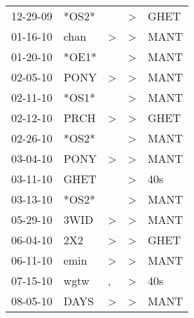\begin{supertabular}{p{0.07\textwidth}p{0.06\textwidth}p{0.02\textwidth}p{0.02\textwidth}p{0.06\textwidth}}
          12-29-09\textsuperscript{} &                            *OS2* &                  &  \textgreater &           GHET\textsuperscript{} \\
          01-16-10\textsuperscript{} &           chan\textsuperscript{} &     \textgreater &  \textgreater &           MANT\textsuperscript{} \\
          01-20-10\textsuperscript{} &                            *OE1* &                  &  \textgreater &           MANT\textsuperscript{} \\
          02-05-10\textsuperscript{} &           PONY\textsuperscript{} &     \textgreater &  \textgreater &           MANT\textsuperscript{} \\
          02-11-10\textsuperscript{} &                            *OS1* &                  &  \textgreater &           MANT\textsuperscript{} \\
          02-12-10\textsuperscript{} &           PRCH\textsuperscript{} &     \textgreater &  \textgreater &           GHET\textsuperscript{} \\
          02-26-10\textsuperscript{} &                            *OS2* &                  &  \textgreater &           MANT\textsuperscript{} \\
          03-04-10\textsuperscript{} &           PONY\textsuperscript{} &     \textgreater &  \textgreater &           MANT\textsuperscript{} \\
          03-11-10\textsuperscript{} &           GHET\textsuperscript{} &                  &  \textgreater &            40s\textsuperscript{} \\
          03-13-10\textsuperscript{} &                            *OS2* &                  &  \textgreater &           MANT\textsuperscript{} \\
          05-29-10\textsuperscript{} &           3WID\textsuperscript{} &     \textgreater &  \textgreater &           MANT\textsuperscript{} \\
          06-04-10\textsuperscript{} &            2X2\textsuperscript{} &     \textgreater &  \textgreater &           GHET\textsuperscript{} \\
          06-11-10\textsuperscript{} &           emin\textsuperscript{} &     \textgreater &  \textgreater &           MANT\textsuperscript{} \\
          07-15-10\textsuperscript{} &           wgtw\textsuperscript{} &                , &  \textgreater &            40s\textsuperscript{} \\
          08-05-10\textsuperscript{} &           DAYS\textsuperscript{} &     \textgreater &  \textgreater &           MANT\textsuperscript{} \\

\end{supertabular}
